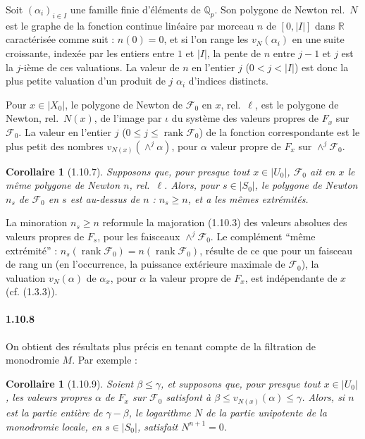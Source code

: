 \documentclass[12pt,a4paper]{article}
\theoremstyle{plain}
\newtheorem{corollary}[theorem]{Corollaire}
\theoremstyle{definition}
\theoremstyle{remark}
\DeclareMathOperator{\rank}{rank}
\newcommand{\QQ}{{\mathbb{Q}}}
\newcommand{\RR}{{\mathbb{R}}}
\begin{document}
Soit $(\alpha_i)_{i \in I}$ une famille finie d'\'el\'ements de $\QQ_p$. Son polygone de Newton rel.~$N$ est le graphe de la fonction continue lin\'eaire par morceau $n$ de $[0, |I|]$ dans $\RR$ caract\'eris\'ee comme suit : $n(0) = 0$, et si l'on range les $v_N(\alpha_i)$ en une suite croissante, index\'ee par les entiers entre $1$ et $|I|$, la pente de $n$ entre $j-1$ et $j$ est la $j$-i\`eme de ces valuations. La valeur de $n$ en l'entier $j$ ($0 < j < |I|$) est donc la plus petite valuation d'un produit de $j$ $\alpha_i$ d'indices distincts.

Pour $x \in |X_0|$, le polygone de Newton de $\mathscr{F}_0$ en $x$, rel.~$\ell$, est le polygone de Newton, rel.~$N(x)$, de l'image par $\iota$ du syst\`eme des valeurs propres de $F_x$ sur $\mathscr{F}_0$. La valeur en l'entier $j$ ($0 \leq j \leq \rank \mathscr{F}_0$) de la fonction correspondante est le plus petit des nombres $v_{N(x)}(\wedge^j \alpha)$, pour $\alpha$ valeur propre de $F_x$ sur $\wedge^j \mathscr{F}_0$.


\begin{corollary}[1.10.7]
Supposons que, pour presque tout $x \in |U_0|$, $\mathscr{F}_0$ ait en $x$ le m\^eme polygone de Newton $n$, rel.~$\ell$. Alors, pour $s \in |S_0|$, le polygone de Newton $n_s$ de $\mathscr{F}_0$ en $s$ est au-dessus de $n$ : $n_s \geq n$, et a les m\^emes extr\'emit\'es.
\end{corollary}

La minoration $n_s \geq n$ reformule la majoration (1.10.3) des valeurs absolues des valeurs propres de $F_s$, pour les faisceaux $\wedge^j \mathscr{F}_0$. Le compl\'ement ``m\^eme extr\'emit\'e'' : $n_s(\rank \mathscr{F}_0) = n(\rank \mathscr{F}_0)$, r\'esulte de ce que pour un faisceau de rang un (en l'occurrence, la puissance ext\'erieure maximale de $\mathscr{F}_0$), la valuation $v_N(\alpha)$ de $\alpha_x$, pour $\alpha$ la valeur propre de $F_x$, est ind\'ependante de $x$ (cf. (1.3.3)).

\paragraph{1.10.8}
On obtient des r\'esultats plus pr\'ecis en tenant compte de la filtration de monodromie $M$. Par exemple :


\begin{corollary}[1.10.9]
Soient $\beta \leq \gamma$, et supposons que, pour presque tout $x \in |U_0|$, les valeurs propres $\alpha$ de $F_x$ sur $\mathscr{F}_0$ satisfont \`a $\beta \leq v_{N(x)}(\alpha) \leq \gamma$. Alors, si $n$ est la partie enti\`ere de $\gamma - \beta$, le logarithme $N$ de la partie unipotente de la monodromie locale, en $s \in |S_0|$, satisfait $N^{n+1} = 0$.
\end{corollary}
\end{document}
